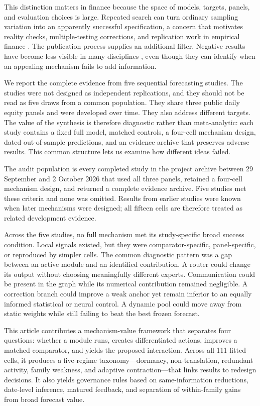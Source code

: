 \documentclass{crebss}
\begin{document}
This distinction matters in finance because the space of models, targets, panels, and evaluation choices is large. Repeated search can turn ordinary sampling variation into an apparently successful specification, a concern that motivates reality checks, multiple-testing corrections, and replication work in empirical finance \citep{white2000reality,harvey2016cross,hou2020replicating}. The publication process supplies an additional filter. Negative results have become less visible in many disciplines \citep{fanelli2012negative}, even though they can identify when an appealing mechanism fails to add information.

We report the complete evidence from five sequential forecasting studies. The studies were not designed as independent replications, and they should not be read as five draws from a common population. They share three public daily equity panels and were developed over time. They also address different targets. The value of the synthesis is therefore diagnostic rather than meta-analytic: each study contains a fixed full model, matched controls, a four-cell mechanism design, dated out-of-sample predictions, and an evidence archive that preserves adverse results. This common structure lets us examine how different ideas failed.

The audit population is every completed study in the project archive between 29 September and 2 October 2026 that used all three panels, retained a four-cell mechanism design, and returned a complete evidence archive. Five studies met these criteria and none was omitted. Results from earlier studies were known when later mechanisms were designed; all fifteen cells are therefore treated as related development evidence.

Across the five studies, no full mechanism met its study-specific broad success condition. Local signals existed, but they were comparator-specific, panel-specific, or reproduced by simpler cells. The common diagnostic pattern was a gap between an active module and an identified contribution. A router could change its output without choosing meaningfully different experts. Communication could be present in the graph while its numerical contribution remained negligible. A correction branch could improve a weak anchor yet remain inferior to an equally informed statistical or neural control. A dynamic pool could move away from static weights while still failing to beat the best frozen forecast.

This article contributes a mechanism-value framework that separates four questions: whether a module runs, creates differentiated actions, improves a matched comparator, and yields the proposed interaction. Across all 111 fitted cells, it produces a five-regime taxonomy---dormancy, non-translation, redundant activity, family weakness, and adaptive contraction---that links results to redesign decisions. It also yields governance rules based on same-information reductions, date-level inference, matured feedback, and separation of within-family gains from broad forecast value.
\end{document}

